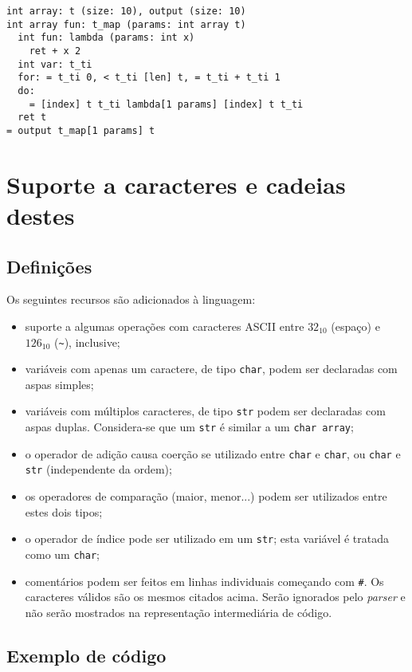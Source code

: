 \documentclass{article}
\newenvironment{smallitem}{
    \vspace{-1mm}
    \begin{itemize}
    \setlength{\parskip}{0pt}
    \setlength{\itemsep}{2pt}
}{
    \vspace{-2mm}
    \end{itemize}
}
\begin{document}
\begin{verbatim}
int array: t (size: 10), output (size: 10)
int array fun: t_map (params: int array t)
  int fun: lambda (params: int x)
    ret + x 2
  int var: t_ti
  for: = t_ti 0, < t_ti [len] t, = t_ti + t_ti 1
  do:
    = [index] t t_ti lambda[1 params] [index] t t_ti
  ret t
= output t_map[1 params] t

\end{verbatim}

\section{Suporte a caracteres e cadeias destes}

\subsection{Definições}

Os seguintes recursos são adicionados à linguagem:

\begin{smallitem}
    \item suporte a algumas operações com caracteres ASCII entre $32_{10}$
        (espaço) e $126_{10}$ (\texttt{\~}), inclusive;
    \item variáveis com apenas um caractere, de tipo \texttt{char}, podem ser
        declaradas com aspas simples;
    \item variáveis com múltiplos caracteres, de tipo \texttt{str} podem ser
        declaradas com aspas duplas. Considera-se que um \texttt{str} é
        similar a um \texttt{char array};
    \item o operador de adição causa coerção se utilizado entre \texttt{char} e
        \texttt{char}, ou \texttt{char} e \texttt{str} (independente da ordem);
    \item os operadores de comparação (maior, menor...) podem ser utilizados
        entre estes dois tipos;
    \item o operador de índice pode ser utilizado em um \texttt{str}; esta
        variável é tratada como um \texttt{char};
    \item comentários podem ser feitos em linhas individuais começando com
        \texttt{\#}. Os caracteres válidos são os mesmos citados acima.
        Serão ignorados pelo \emph{parser} e não serão mostrados na
        representação intermediária de código.
\end{smallitem}

\subsection{Exemplo de código}
\end{document}
